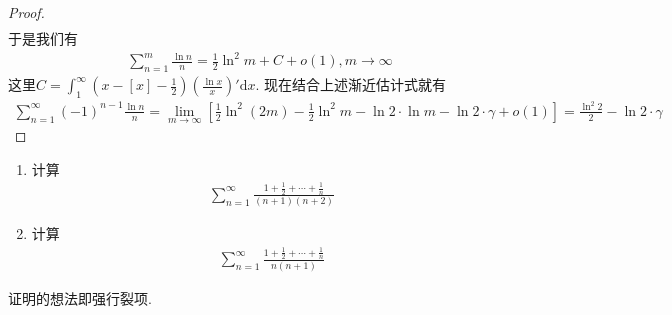 \documentclass[../../main.tex]{subfiles}%
\begin{document}
\begin{proof}
\begin{align*}
\end{align*}
于是我们有
\begin{align*}
\sum_{n=1}^{m} \frac{\ln n}{n} = \frac{1}{2} \ln^2 m + C + o(1), m \to \infty
\end{align*}
这里$C = \int_{1}^{\infty} \left( x - [x] - \frac{1}{2} \right) \left( \frac{\ln x}{x} \right)' \mathrm{d}x$. 现在结合上述渐近估计式就有
\begin{align*}
\sum_{n=1}^{\infty} (-1)^{n - 1} \frac{\ln n}{n} = \lim_{m \to \infty} \left[ \frac{1}{2} \ln^2 (2m) - \frac{1}{2} \ln^2 m - \ln 2 \cdot \ln m - \ln 2 \cdot \gamma + o(1) \right] = \frac{\ln^2 2}{2} - \ln 2 \cdot \gamma
\end{align*}

\end{proof}

\begin{example}
\begin{enumerate}
\item 计算
\begin{align*}
\sum_{n=1}^{\infty} \frac{1 + \frac{1}{2} + \cdots + \frac{1}{n}}{(n + 1)(n + 2)}
\end{align*}

\item 计算
\begin{align*}
\sum_{n=1}^{\infty} \frac{1 + \frac{1}{2} + \cdots + \frac{1}{n}}{n(n + 1)}
\end{align*}
\end{enumerate}
\end{example}
\begin{note}
证明的想法即强行裂项.
\end{note}
\end{document}
